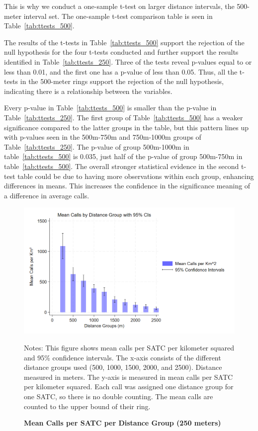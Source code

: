 \documentclass[12pt]{article}
\begin{document}
This is why we conduct a one-sample t-test on larger distance intervals, the 500-meter interval set. The one-sample t-test comparison table is seen in Table~\ref{tab:ttests_500}. 

The results of the t-tests in Table~\ref{tab:ttests_500} support the rejection of the null hypothesis for the four t-tests conducted and further support the results identified in Table~\ref{tab:ttests_250}. Three of the tests reveal p-values equal to or less than 0.01, and the first one has a p-value of less than 0.05. Thus, all the t-tests in the 500-meter rings support the rejection of the null hypothesis, indicating there is a relationship between the variables. 

Every p-value in Table~\ref{tab:ttests_500} is smaller than the p-value in Table~\ref{tab:ttests_250}. The first group of Table~\ref{tab:ttests_500} has a weaker significance compared to the latter groups in the table, but this pattern lines up with p-values seen in the 500m-750m and 750m-1000m groups of Table~\ref{tab:ttests_250}. The p-value of group 500m-1000m in table~\ref{tab:ttests_500} is 0.035, just half of the p-value of group 500m-750m in table~\ref{tab:ttests_500}. The overall stronger statistical evidence in the second t-test table could be due to having more observations within each group, enhancing differences in means. This increases the confidence in the significance meaning of a difference in average calls.

\begin{figure}[H]
    \centering
\includegraphics[width=0.75\linewidth]{Reproducibility Package/Downloaded_calls/Visual_Graphics_Downloaded_calls/250_CI_Graph.png}
    \caption{\textbf{Mean Calls per SATC per Distance Group (250 meters)}}
     \label{fig:Figure3}
    \centering\footnotesize{Notes: This figure shows mean calls per SATC per kilometer squared and 95\% confidence intervals. The x-axis consists of the different distance groups used (500, 1000, 1500, 2000, and 2500). Distance measured in meters. The y-axis is measured in mean calls per SATC per kilometer squared. Each call was assigned one distance group for one SATC, so there is no double counting. The mean calls are counted to the upper bound of their ring.}
\end{figure}
\end{document}
